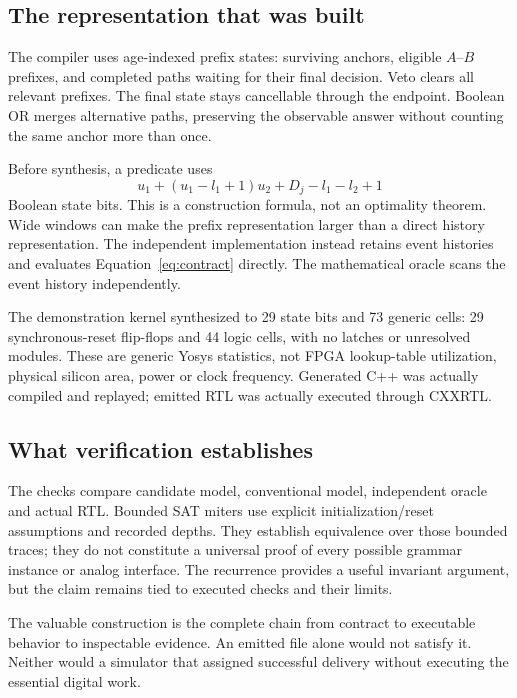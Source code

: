 \subsection{The representation that was built}
The compiler uses age-indexed prefix states: surviving anchors, eligible $A$--$B$ prefixes, and completed paths waiting for their final decision. Veto clears all relevant prefixes. The final state stays cancellable through the endpoint. Boolean OR merges alternative paths, preserving the observable answer without counting the same anchor more than once.

Before synthesis, a predicate uses
\begin{equation}
u_1+(u_1-l_1+1)u_2+D_j-l_1-l_2+1
\end{equation}
Boolean state bits. This is a construction formula, not an optimality theorem. Wide windows can make the prefix representation larger than a direct history representation. The independent implementation instead retains event histories and evaluates Equation~\ref{eq:contract} directly. The mathematical oracle scans the event history independently.

The demonstration kernel synthesized to 29 state bits and 73 generic cells: 29 synchronous-reset flip-flops and 44 logic cells, with no latches or unresolved modules. These are generic Yosys statistics, not FPGA lookup-table utilization, physical silicon area, power or clock frequency. Generated C++ was actually compiled and replayed; emitted RTL was actually executed through CXXRTL.

\subsection{What verification establishes}
The checks compare candidate model, conventional model, independent oracle and actual RTL. Bounded SAT miters use explicit initialization/reset assumptions and recorded depths. They establish equivalence over those bounded traces; they do not constitute a universal proof of every possible grammar instance or analog interface. The recurrence provides a useful invariant argument, but the claim remains tied to executed checks and their limits.

The valuable construction is the complete chain from contract to executable behavior to inspectable evidence. An emitted file alone would not satisfy it. Neither would a simulator that assigned successful delivery without executing the essential digital work.
